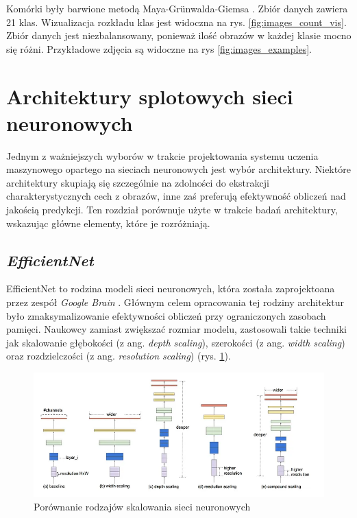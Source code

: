 Komórki były barwione metodą Maya-Grünwalda-Giemsa \cite{histology}. Zbiór danych zawiera 21 klas.
Wizualizacja rozkładu klas jest widoczna na rys. \ref{fig:images_count_vis}.
Zbiór danych jest niezbalansowany, ponieważ ilość obrazów w każdej klasie mocno się różni.
Przykładowe zdjęcia są widoczne na rys \ref{fig:images_examples}.


\section{Architektury splotowych sieci neuronowych}

Jednym z ważniejszych wyborów w trakcie projektowania systemu uczenia maszynowego opartego na sieciach neuronowych jest wybór architektury.
Niektóre architektury skupiają się szczególnie na zdolności do ekstrakcji charakterystycznych cech z obrazów, inne zaś preferują efektywność obliczeń nad jakością predykcji.
Ten rozdział porównuje użyte w trakcie badań architektury, wskazując główne elementy, które je rozróżniają.

\subsection{\textit{EfficientNet}}

EfficientNet to rodzina modeli sieci neuronowych, która została zaprojektoana przez zespół \textit{Google Brain} \cite{efficientnet}.
Głównym celem opracowania tej rodziny architektur było zmaksymalizowanie efektywności obliczeń przy ograniczonych zasobach pamięci.
Naukowcy zamiast zwiększać rozmiar modelu, zastosowali takie techniki jak skalowanie głębokości (z ang. \textit{depth scaling}), szerokości (z ang. \textit{width scaling}) oraz rozdzielczości (z ang. \textit{resolution scaling}) (rys. \ref{fig:scaling}).

\begin{figure}
    \centering
    \includegraphics[width=\textwidth]{scaling}
    \caption{Porównanie rodzajów skalowania sieci neuronowych}
    \label{fig:scaling}
\end{figure}

